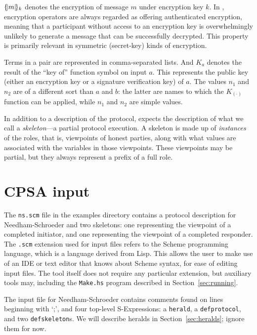 $\{\!|m|\!\}_{k}$ denotes the encryption of message $m$ under encryption
key $k$.  In {\cpsa}, encryption operators are always regarded as
offering authenticated encryption, meaning that a participant without
access to an encryption key is overwhelmingly unlikely to generate a
message that can be successfully decrypted.  This property is
primarily relevant in symmetric (secret-key) kinds of encryption.

Terms in a pair are represented in comma-separated lists.  And $K_a$
denotes the result of the ``key of'' function symbol on input $a$.
This represents the public key (either an encryption key or a
signature verification key) of $a$.  The values $n_1$ and $n_2$ are of
a different sort than $a$ and $b$: the latter are names to which the
$K_{(\cdot)}$ function can be applied, while $n_1$ and $n_2$ are
simple values.

In addition to a description of the protocol, {\cpsa} expects the
description of what we call a \emph{skeleton}---a partial protocol
execution.  A skeleton is made up of \emph{instances} of the roles, that is,
viewpoints of honest parties, along with what values are associated with the
variables in those viewpoints.  These viewpoints may be partial, but they
always represent a prefix of a full role.

\section{CPSA input}

 The \texttt{ns.scm} file in the examples
directory contains a protocol description for Needham-Schroeder and
two skeletons: one representing the viewpoint of a completed
initiator, and one representing the viewpoint of a completed
responder.  The \texttt{.scm} extension used for {\cpsa} input files
refers to the Scheme programming language, which is a language derived
from Lisp.  This allows the user to make use of an IDE or text editor
that knows about Scheme syntax, for ease of editing input files.  The
{\cpsa} tool itself does not require any particular extension, but
auxiliary tools may, including the \texttt{Make.hs} program described
in Section~\ref{sec:running}.

  The input file for
Needham-Schroeder contains comments found on lines beginning with `;',
and four top-level S-Expressions: a \texttt{herald}, a \texttt{defprotocol},
and two \texttt{defskeleton}s.  We will describe heralds in
Section~\ref{sec:heralds}; ignore them for now.

